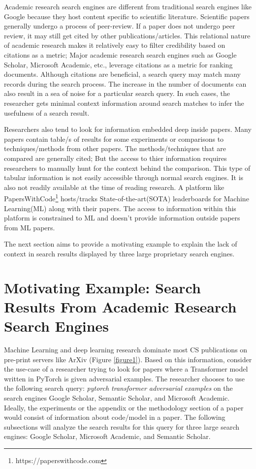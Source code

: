 Academic research search engines are different from traditional search engines like Google because they host content specific to scientific literature. 
Scientific papers generally undergo a process of peer-review. If a paper does not undergo peer review, it may still get cited by other publications/articles. This relational nature of academic research makes it relatively easy to filter credibility based on citations as a metric; Major academic research search engines such as Google Scholar, Microsoft Academic, etc., leverage citations as a metric for ranking documents. Although citations are beneficial, a search query may match many records during the search process. The increase in the number of documents can also result in a sea of noise for a particular search query. In such cases, the researcher gets minimal context information around search matches to infer the usefulness of a search result. 

Researchers also tend to look for information embedded deep inside papers. Many papers contain table/s of results for some experiments or comparisons to techniques/methods from other papers. The methods/techniques that are compared are generally cited; But the access to thier information requires researchers to manually hunt for the context behind the comparison. This type of tabular information is not easily accessible through normal search engines. It is also not readily available at the time of reading research. A platform like PapersWithCode\footnote{https://paperswithcode.com} hosts/tracks State-of-the-art(SOTA) leaderboards for Machine Learning(ML) along with their papers. The access to information within this platform is constrained to ML and doesn't provide information outside papers from ML papers. 

The next section aims to provide a motivating example to explain the lack of context in search results displayed by three large proprietary search engines.

\section{Motivating Example: Search Results From Academic Research Search Engines}
Machine Learning and deep learning research dominate most CS publications on pre-print servers like ArXiv (Figure \ref{figure1}).
Based on this information, consider the use-case of a researcher trying to look for papers where a Transformer\parencite{vaswani2017attention} model written in PyTorch\parencite{paszke2019pytorch} is given adversarial examples. 
The researcher chooses to use the following search query: \textit{pytorch transformer adversarial examples} on the search engines Google Scholar, Semantic Scholar, and Microsoft Academic. 
Ideally, the experiments or the appendix or the methodology section of a paper would consist of information about code/model in a paper. 
The following subsections will analyze the search results for this query for three large search engines: Google Scholar, Microsoft Academic, and Semantic Scholar. 
\pagebreak
